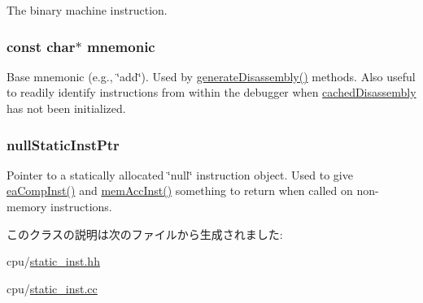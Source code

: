 The binary machine instruction. \hypertarget{classStaticInst_adfacb526b8ab378bf36f1324303635d0}{
\subsubsection[{mnemonic}]{\setlength{\rightskip}{0pt plus 5cm}const char$\ast$ {\bf mnemonic}}}
\label{classStaticInst_adfacb526b8ab378bf36f1324303635d0}
Base mnemonic (e.g., \char`\"{}add\char`\"{}). Used by \hyperlink{classStaticInst_ab4a569d2623620c04f8a52bbd91d63b9}{generateDisassembly()} methods. Also useful to readily identify instructions from within the debugger when \hyperlink{classStaticInst_aca407a93c3360ff06d5d52f92583a6e1}{cachedDisassembly} has not been initialized. \hypertarget{classStaticInst_aa793d9793af735f09096369fb17567b6}{
\subsubsection[{nullStaticInstPtr}]{ {\bf nullStaticInstPtr}}}
\label{classStaticInst_aa793d9793af735f09096369fb17567b6}
Pointer to a statically allocated \char`\"{}null\char`\"{} instruction object. Used to give \hyperlink{classStaticInst_ad814fb0b7773dc1fae7dffac00156583}{eaCompInst()} and \hyperlink{classStaticInst_ad80579a806c548f2fc2ec4fd12236f36}{memAccInst()} something to return when called on non-\/memory instructions. 

このクラスの説明は次のファイルから生成されました:\begin{DoxyCompactItemize}
\item 
cpu/\hyperlink{cpu_2static__inst_8hh}{static\_\-inst.hh}\item 
cpu/\hyperlink{cpu_2static__inst_8cc}{static\_\-inst.cc}\end{DoxyCompactItemize}

